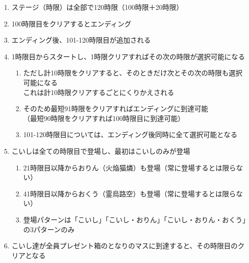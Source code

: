 \begin{enumerate}[label={\sarrow}]
\item ステージ（時限）は全部で120時限（100時限＋20時限）
\item 100時限目をクリアするとエンディング
\item エンディング後、101-120時限目が追加される
\item 1時限目からスタートし、1時限クリアすればその次の時限が選択可能になる
  \begin{enumerate}[label={\sarrow}]
  \item ただし計10時限をクリアすると、そのときだけ次とその次の時限も選択可能になる\\
        これは計10時限クリアするごとにくりかえされる
  \item そのため最短91時限をクリアすればエンディングに到達可能\\
        （最短90時限をクリアすれば100時限目に到達可能）
  \item 101-120時限目については、エンディング後同時に全て選択可能となる
  \end{enumerate}
\item こいしは全ての時限目で登場し、最初はこいしのみが登場
  \begin{enumerate}[label={\sarrow}]
  \item 21時限目以降からおりん（火焔猫燐）も登場（常に登場するとは限らない）
  \item 41時限目以降からおくう（霊烏路空）も登場（常に登場するとは限らない）
  \item 登場パターンは「こいし」「こいし・おりん」「こいし・おりん・おくう」の3パターンのみ
  \end{enumerate}
\item こいし達が全員プレゼント箱のとなりのマスに到達すると、その時限目のクリアとなる
\end{enumerate}



\clearpage


